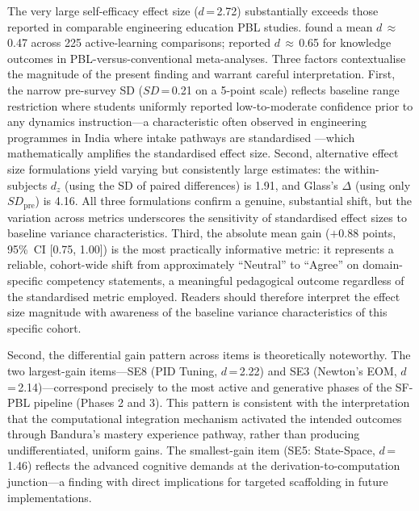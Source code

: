 \documentclass[utf8]{FrontiersinHarvard}
\begin{document}
The very large self-efficacy effect size ($d$\,=\,2.72) substantially
exceeds those reported in comparable engineering education PBL studies.
\citet{freeman2014active} found a mean $d$\,$\approx$\,0.47 across 225
active-learning comparisons; \citet{dochy2003effects} reported
$d$\,$\approx$\,0.65 for knowledge outcomes in PBL-versus-conventional
meta-analyses. {\color{blue} Three factors contextualise the magnitude of the present
finding and warrant careful interpretation. First, the narrow pre-survey
SD ($SD$\,=\,0.21 on a 5-point scale) reflects baseline range
restriction where students uniformly reported low-to-moderate confidence
prior to any dynamics instruction---a characteristic often observed in
engineering programmes in India where intake pathways are
standardised \citep{streveler2008learning}---which mathematically amplifies
the standardised effect size. Second, alternative effect size formulations
yield varying but consistently large estimates: the within-subjects
$d_z$ (using the SD of paired differences) is 1.91, and Glass's
$\Delta$ (using only $SD_{\text{pre}}$) is 4.16. All three formulations
confirm a genuine, substantial shift, but the variation across metrics
underscores the sensitivity of standardised effect sizes to baseline
variance characteristics. Third, the absolute mean gain ($+$0.88 points,
95\%~CI [0.75, 1.00]) is the most practically informative metric:
it represents a reliable, cohort-wide shift from approximately ``Neutral''
to ``Agree'' on domain-specific competency statements, a meaningful
pedagogical outcome regardless of the standardised metric employed.
Readers should therefore interpret the effect size magnitude with awareness
of the baseline variance characteristics of this specific cohort.}

Second, the differential gain pattern across items is theoretically
noteworthy. The two largest-gain items---SE8 (PID Tuning, $d$\,=\,2.22)
and SE3 (Newton's EOM, $d$\,=\,2.14)---correspond precisely to the most
active and generative phases of the SF-PBL pipeline (Phases 2 and 3).
{\color{blue} This pattern is consistent with the interpretation that the computational
integration mechanism activated the intended outcomes} through Bandura's
\citeyearpar{bandura1997self} mastery experience pathway, rather than
producing undifferentiated, uniform gains.
The smallest-gain item (SE5: State-Space, $d$\,=\,1.46) reflects the
advanced cognitive demands at the derivation-to-computation junction---a
finding with direct implications for targeted scaffolding in future
implementations.
\end{document}
